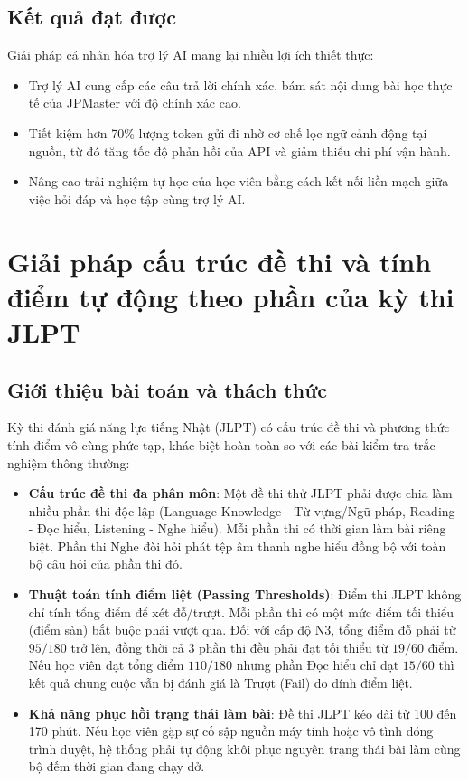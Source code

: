 \documentclass[../DoAn.tex]{subfiles}
\begin{document}
\subsection{Kết quả đạt được}
Giải pháp cá nhân hóa trợ lý AI mang lại nhiều lợi ích thiết thực:
\begin{itemize}
    \item Trợ lý AI cung cấp các câu trả lời chính xác, bám sát nội dung bài học thực tế của JPMaster với độ chính xác cao.
    \item Tiết kiệm hơn 70\% lượng token gửi đi nhờ cơ chế lọc ngữ cảnh động tại nguồn, từ đó tăng tốc độ phản hồi của API và giảm thiểu chi phí vận hành.
    \item Nâng cao trải nghiệm tự học của học viên bằng cách kết nối liền mạch giữa việc hỏi đáp và học tập cùng trợ lý AI.
\end{itemize}

\section{Giải pháp cấu trúc đề thi và tính điểm tự động theo phần của kỳ thi JLPT}

\subsection{Giới thiệu bài toán và thách thức}
Kỳ thi đánh giá năng lực tiếng Nhật (JLPT) có cấu trúc đề thi và phương thức tính điểm vô cùng phức tạp, khác biệt hoàn toàn so với các bài kiểm tra trắc nghiệm thông thường:
\begin{itemize}
    \item \textbf{Cấu trúc đề thi đa phân môn}: Một đề thi thử JLPT phải được chia làm nhiều phần thi độc lập (Language Knowledge - Từ vựng/Ngữ pháp, Reading - Đọc hiểu, Listening - Nghe hiểu). Mỗi phần thi có thời gian làm bài riêng biệt. Phần thi Nghe đòi hỏi phát tệp âm thanh nghe hiểu đồng bộ với toàn bộ câu hỏi của phần thi đó.
    \item \textbf{Thuật toán tính điểm liệt (Passing Thresholds)}: Điểm thi JLPT không chỉ tính tổng điểm để xét đỗ/trượt. Mỗi phần thi có một mức điểm tối thiểu (điểm sàn) bắt buộc phải vượt qua. Đối với cấp độ N3, tổng điểm đỗ phải từ $95/180$ trở lên, đồng thời cả 3 phần thi đều phải đạt tối thiểu từ $19/60$ điểm. Nếu học viên đạt tổng điểm $110/180$ nhưng phần Đọc hiểu chỉ đạt $15/60$ thì kết quả chung cuộc vẫn bị đánh giá là Trượt (Fail) do dính điểm liệt.
    \item \textbf{Khả năng phục hồi trạng thái làm bài}: Đề thi JLPT kéo dài từ 100 đến 170 phút. Nếu học viên gặp sự cố sập nguồn máy tính hoặc vô tình đóng trình duyệt, hệ thống phải tự động khôi phục nguyên trạng thái bài làm cùng bộ đếm thời gian đang chạy dở.
\end{itemize}
\end{document}
